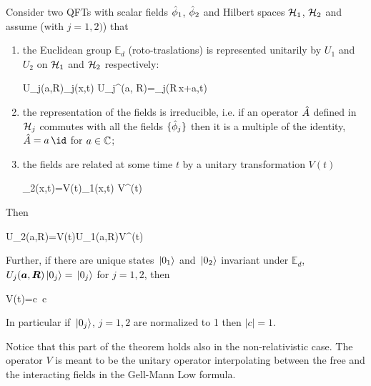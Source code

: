 \documentclass[../main/main.tex]{subfiles}
\begin{document}
\begin{theorem}\label{thm:HHW1}
	Consider two QFTs with scalar fields $\hat{\phi}_1$, $\hat{\phi}_2$ and Hilbert spaces $\mathcal H_1$, $\mathcal H_2$ and assume (with $j =1,2)$) that
	\begin{enumerate}[label=(\roman*)]
	\item the Euclidean group $\mathbb E_d$ (roto-traslations) is represented unitarily by $U_1$ and $U_2$ on $\mathcal H_1$ and $\mathcal H_2$ respectively:
	\begin{eq}
		U_j(\vec a,\vec R)\ophi_j(\vec x,t) U_j^\dagger(\vec a, \vec R)=\ophi_j(\vec R\,\vec x+\vec a,t)
	\end{eq}
	\item the representation of the fields is irreducible, i.e. if an operator $\hat{A}$ defined in $\mathcal H_j$ commutes with all the fields $\{\hat{\phi}_j\}$ then it is a multiple of the identity, $\op A=a\,\id$ for $a\in\mathbb{C}$;
	\item the fields are related at some time $t$ by a unitary transformation $V(t)$
	\begin{eq}\label{eq:HHW-hp-fields}
		\ophi_2(\vec x,t)=V(t)\ophi_1(\vec x,t) V^\dagger(t)
	\end{eq}
	\end{enumerate}
	Then 
	\begin{eq}\label{eq:HHW1_thesis1}
		U_2(\vec a,\vec R)=V(t)U_1(\vec a,\vec R)V^\dagger(t)
	\end{eq}
	Further, if there are unique states $\,\vert0_1\rangle$ and $\,\vert0_2\rangle$ invariant under $\mathbb E_d$, $U_j(\boldsymbol a,\boldsymbol R)\,\vert0_j\rangle=\,\vert0_j\rangle$ for $j=1,2$, then
	\begin{eq}\label{eq:HHW1_thesis2}
		V(t)=c\, \twith c\in\C
	\end{eq}
	In particular if $\,\vert0_j\rangle$, $j=1,2$ are normalized to 1 then $|c|=1$.
\end{theorem}

Notice that this part of the theorem holds also in the non-relativistic case. The operator $V$ is meant to be the unitary operator interpolating between the free and the interacting fields in the Gell-Mann Low formula.
\end{document}
